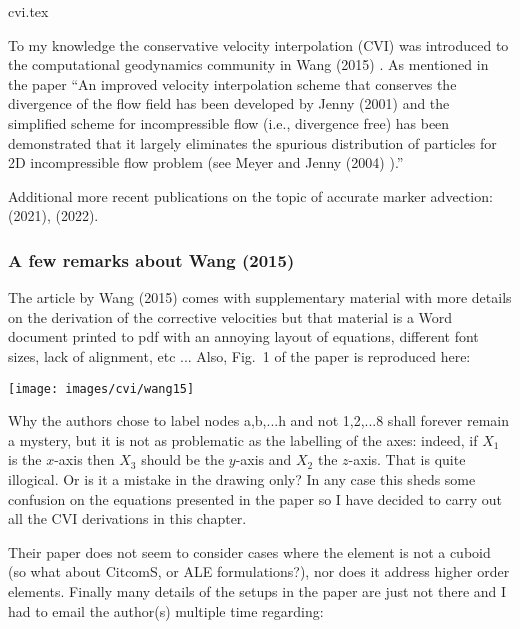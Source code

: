 \begin{flushright} {\tiny {\color{gray} cvi.tex}} \end{flushright}


To my knowledge the conservative velocity interpolation (CVI) was introduced to 
the computational geodynamics community in Wang \etal (2015) \cite{waav15}. 
As mentioned in the paper 
``An improved velocity interpolation scheme that conserves the divergence of the flow field has 
been developed by Jenny \etal (2001) \cite{jepm01} and the simplified scheme for incompressible 
flow (i.e., divergence free) has been demonstrated that it largely eliminates the spurious 
distribution of particles for 2D incompressible flow problem (see Meyer and Jenny (2004) \cite{meje04}).''

Additional more recent publications on the topic of accurate marker 
advection: \textcite{simw21} (2021), \textcite{siwv22} (2022).

\subsubsection{A few remarks about Wang \etal (2015)}

The article by Wang \etal (2015) comes with supplementary material with more details on the 
derivation of the corrective velocities but that material is a Word
document printed to pdf with an annoying layout of equations, different font sizes,
lack of alignment, etc ... 
Also, Fig.~1 of the paper is reproduced here:
\begin{center}
\texttt{[image: images/cvi/wang15]}
\end{center}
Why the authors chose to label nodes a,b,...h and not 1,2,...8 shall forever remain 
a mystery, but it is not as problematic as the labelling of the axes:
indeed, if $X_1$ is the $x$-axis then $X_3$ should be the $y$-axis 
and $X_2$ the $z$-axis. That is quite illogical. Or is it a mistake in 
the drawing only? In any case this sheds some confusion on the equations 
presented in the paper so I have decided to carry out all the CVI derivations 
in this chapter.

Their paper does not seem to consider cases where the element is not a 
cuboid (so what about CitcomS, or ALE formulations?), nor does it address higher order elements. 
Finally many details of the setups in the paper are just not there and I had to 
email the author(s) multiple time regarding:

